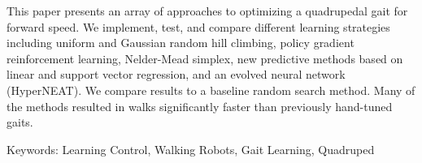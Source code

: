 
This paper presents an array of approaches to optimizing a quadrupedal
gait for forward speed.  We implement, test, and compare different
learning strategies including uniform and Gaussian random hill
climbing, policy gradient reinforcement learning\cite{kohl},
Nelder-Mead simplex\cite{nm}, new predictive methods based on linear
and support vector regression, and an evolved neural network
(HyperNEAT)\cite{clune}.  We compare results to a baseline random
search method.  Many of the methods resulted in walks significantly
faster than previously hand-tuned gaits.


Keywords: Learning Control, Walking Robots, Gait Learning, Quadruped
